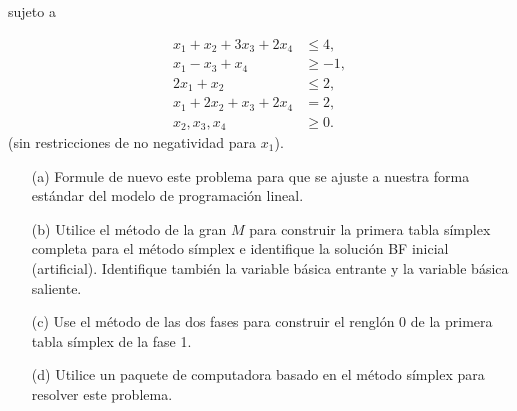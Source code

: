 \documentclass{article}
\begin{document}
sujeto a 

\[
\begin{aligned}
x_1 + x_2 + 3x_3 + 2x_4 &\leq 4, \\
x_1 - x_3 + x_4 &\geq -1, \\
2x_1 + x_2 &\leq 2, \\
x_1 + 2x_2 + x_3 + 2x_4 &= 2, \\
x_2, x_3, x_4 & \geq 0.
\end{aligned}
\]
(sin restricciones de no negatividad para $x_1$).

\begin{enumerate}
    \item[(a)] Formule de nuevo este problema para que se ajuste a nuestra forma estándar del modelo de programación lineal.
    \item[(b)] Utilice el método de la gran $M$ para construir la primera tabla símplex completa para el método símplex e identifique la solución BF inicial (artificial). Identifique también la variable básica entrante y la variable básica saliente.
    \item[(c)] Use el método de las dos fases para construir el renglón 0 de la primera tabla símplex de la fase 1.
    \item[(d)] Utilice un paquete de computadora basado en el método símplex para resolver este problema.
\end{enumerate}
\end{document}
